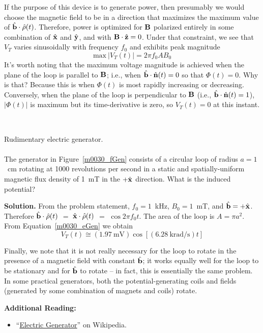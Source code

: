 If the purpose of this device is to generate power, then presumably we would choose the magnetic field to be in a direction that maximizes the maximum value of $\hat{\bf b}\cdot\hat{\bf \rho}(t)$.
Therefore, power is optimized for ${\bf B}$ polarized entirely in some combination of $\hat{\bf x}$ and $\hat{\bf y}$, and with ${\bf B}\cdot\hat{\bf z}=0$. 
Under that constraint, we see that $V_T$ varies sinusoidally with frequency $f_0$ and exhibits peak magnitude 
%
\begin{equation}  
\boxed{ 
\mbox{max}~\left|V_T(t)\right| = 2\pi f_0 A B_0 
}
\end{equation}
%
It's worth noting that the maximum voltage magnitude is achieved when the plane of the loop is parallel to ${\bf B}$; i.e., when $\hat{\bf b}\cdot\hat{\bf n}(t)=0$ so that $\Phi(t)=0$.  Why is that?  Because this is when $\Phi(t)$ is most rapidly increasing or decreasing.
Conversely, when the plane of the loop is perpendicular to ${\bf B}$ (i.e., $\hat{\bf b}\cdot\hat{\bf n}(t)=1$), $\left|\Phi(t)\right|$ is maximum but its time-derivative is zero, so $V_T(t)=0$ at this instant.

~\\ \begin{example} 
\begin{mdframed}[backgroundcolor=brown!20,linecolor=brown!20]\raggedright
Rudimentary electric generator.
\\~\\
The generator in Figure~\ref{m0030_fGen} consists of a circular loop of radius $a=1$~cm rotating at 1000 revolutions per second in a static and spatially-uniform magnetic flux density of 1~mT in the $+\hat{\bf x}$ direction.
What is the induced potential?

{\bf Solution.}
From the problem statement, $f_0=1$~kHz, $B_0=1$~mT, and $\hat{\bf b}=+\hat{\bf x}$.
Therefore $\hat{\bf b}\cdot\hat{\bf \rho}(t)$ $=$ $\hat{\bf x}\cdot\hat{\bf \rho}(t)$ $=$ $\cos 2\pi f_0 t$.
The area of the loop is $A=\pi a^2$.
From Equation~\ref{m0030_eGen} we obtain 
%
\begin{equation}
V_T(t) \cong \left(1.97~\mbox{mV}\right)\cos\left[\left(6.28~\mbox{krad/s}\right)t\right] 
\nonumber
\end{equation}
\end{mdframed}
\end{example}

Finally, we note that it is not really necessary for the loop to rotate in the presence of a magnetic field with constant $\hat{\bf b}$; it works equally well for the loop to be stationary and for $\hat{\bf b}$ to rotate -- in fact, this is essentially the same problem.  In some practical generators, both the potential-generating coils and fields (generated by some combination of magnets and coils) rotate.


{\bf Additional Reading:}
\begin{itemize}
\item ``\href{https://en.wikipedia.org/wiki/Electric_generator}{Electric Generator}'' on Wikipedia.
\end{itemize}

